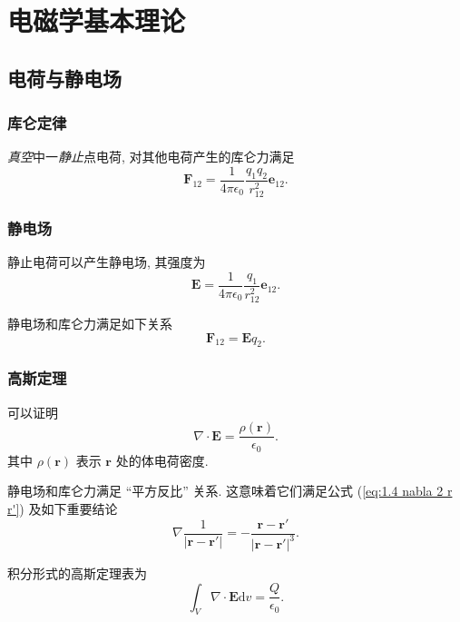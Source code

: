 \section{电磁学基本理论}
\subsection{电荷与静电场}
\subsubsection{库仑定律}
\textit{真空}中一\textit{静止}点电荷, 对其他电荷产生的库仑力满足
\begin{equation}
    \bm{F}_{12}=\frac{1}{4\pi\epsilon_0}\frac{q_1q_2}{r_{12}^2}\bm{e}_{12}.
\end{equation}

\subsubsection{静电场}
静止电荷可以产生静电场, 其强度为
\begin{equation}
    \bm{E}=\frac{1}{4\pi\epsilon_0}\frac{q_1}{r_{12}^2}\bm{e}_{12}.
\end{equation}

静电场和库仑力满足如下关系
\begin{equation}
    \bm{F}_{12}=\bm{E}q_2.
\end{equation}

\subsubsection{高斯定理}
可以证明
\begin{equation}
    \nabla\cdot\bm{E}=\frac{\rho(\bm{r})}{\epsilon_0}.
\end{equation}
其中 $\rho(\bm{r})$ 表示 $\bm{r}$ 处的体电荷密度.

静电场和库仑力满足 ``平方反比'' 关系. 这意味着它们满足公式 (\ref{eq:1.4 nabla 2 r r'}) 及如下重要结论
\begin{equation}
    \nabla\frac{1}{|\bm{r}-\bm{r}'|}=-\frac{\bm{r}-\bm{r}'}{|\bm{r}-\bm{r}'|^3}.
\end{equation}

积分形式的高斯定理表为
\begin{equation}
    \int_V\nabla\cdot\bm{E}\mathrm{d}v=\frac{Q}{\epsilon_0}.
\end{equation}
